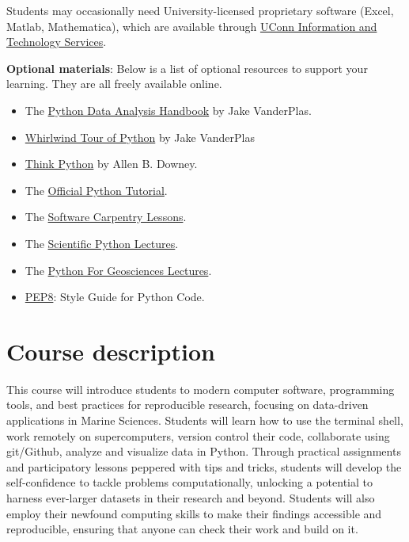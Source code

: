 \documentclass[11pt]{article}
\begin{document}
Students may occasionally need University-licensed proprietary software (Excel, Matlab, Mathematica), which are available through \href{https://software.uconn.edu/software}{UConn Information and Technology Services}.

\textbf{Optional materials}: Below is a list of optional resources to support your learning. They are all freely available online.

	\begin{itemize}
		\item The \href{https://jakevdp.github.io/PythonDataScienceHandbook/}{Python Data Analysis Handbook} by Jake VanderPlas.	
		\item \href{https://github.com/jakevdp/WhirlwindTourOfPython}{Whirlwind Tour of Python} by Jake VanderPlas
		\item \href{http://greenteapress.com/wp/think-python-2e/}{Think Python} by Allen B. Downey.
		\item The \href{https://docs.python.org/3/tutorial/}{Official Python Tutorial}.
		\item The \href{https://software-carpentry.org/lessons/}{Software Carpentry Lessons}.
		\item The   \href{http://scipy-lectures.org}{Scientific Python Lectures}. 
		\item The \href{https://github.com/koldunovn/python_for_geosciences}{Python For Geosciences Lectures}.
		\item \href{https://www.python.org/dev/peps/pep-0008/}{PEP8}: Style Guide for Python Code.

	\end{itemize}



\section*{Course description}

This course will introduce students to modern computer software, programming
tools, and best practices for reproducible research, focusing on data-driven
applications in Marine Sciences. Students will learn how to use the terminal
shell, work remotely on supercomputers, version control their code, collaborate
using git/Github, analyze and visualize data in Python. Through practical
assignments and participatory lessons peppered with tips and tricks, students
will develop the self-confidence to tackle problems computationally, unlocking
a potential to harness ever-larger datasets in their research and beyond.
Students will also employ their newfound computing skills to make their findings
accessible and reproducible, ensuring that anyone can check their work and build on it. 
\end{document}
